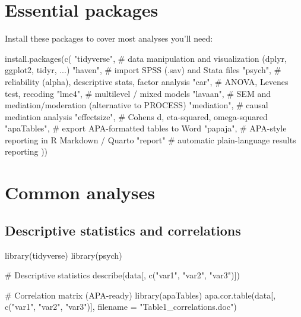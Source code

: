\documentclass[
  11pt,
  a4paper,
]{scrbook}
\newenvironment{Shaded}{\begin{snugshade}}{\end{snugshade}}
\newcommand{\AttributeTok}[1]{\textcolor[rgb]{0.40,0.45,0.13}{#1}}
\newcommand{\CommentTok}[1]{\textcolor[rgb]{0.37,0.37,0.37}{#1}}
\newcommand{\FunctionTok}[1]{\textcolor[rgb]{0.28,0.35,0.67}{#1}}
\newcommand{\NormalTok}[1]{\textcolor[rgb]{0.00,0.23,0.31}{#1}}
\newcommand{\StringTok}[1]{\textcolor[rgb]{0.13,0.47,0.30}{#1}}
\begin{document}
\section{Essential packages}\label{essential-packages}

Install these packages to cover most analyses you'll need:

\begin{Shaded}
\begin{Highlighting}[]
\FunctionTok{install.packages}\NormalTok{(}\FunctionTok{c}\NormalTok{(}
  \StringTok{"tidyverse"}\NormalTok{,   }\CommentTok{\# data manipulation and visualization (dplyr, ggplot2, tidyr, ...)}
  \StringTok{"haven"}\NormalTok{,       }\CommentTok{\# import SPSS (.sav) and Stata files}
  \StringTok{"psych"}\NormalTok{,       }\CommentTok{\# reliability (alpha), descriptive stats, factor analysis}
  \StringTok{"car"}\NormalTok{,         }\CommentTok{\# ANOVA, Levene\textquotesingle{}s test, recoding}
  \StringTok{"lme4"}\NormalTok{,        }\CommentTok{\# multilevel / mixed models}
  \StringTok{"lavaan"}\NormalTok{,      }\CommentTok{\# SEM and mediation/moderation (alternative to PROCESS)}
  \StringTok{"mediation"}\NormalTok{,   }\CommentTok{\# causal mediation analysis}
  \StringTok{"effectsize"}\NormalTok{,  }\CommentTok{\# Cohen\textquotesingle{}s d, eta{-}squared, omega{-}squared}
  \StringTok{"apaTables"}\NormalTok{,   }\CommentTok{\# export APA{-}formatted tables to Word}
  \StringTok{"papaja"}\NormalTok{,      }\CommentTok{\# APA{-}style reporting in R Markdown / Quarto}
  \StringTok{"report"}       \CommentTok{\# automatic plain{-}language results reporting}
\NormalTok{))}
\end{Highlighting}
\end{Shaded}

\section{Common analyses}\label{common-analyses}

\subsection{Descriptive statistics and
correlations}\label{descriptive-statistics-and-correlations}

\begin{Shaded}
\begin{Highlighting}[]
\FunctionTok{library}\NormalTok{(tidyverse)}
\FunctionTok{library}\NormalTok{(psych)}

\CommentTok{\# Descriptive statistics}
\FunctionTok{describe}\NormalTok{(data[, }\FunctionTok{c}\NormalTok{(}\StringTok{"var1"}\NormalTok{, }\StringTok{"var2"}\NormalTok{, }\StringTok{"var3"}\NormalTok{)])}

\CommentTok{\# Correlation matrix (APA{-}ready)}
\FunctionTok{library}\NormalTok{(apaTables)}
\FunctionTok{apa.cor.table}\NormalTok{(data[, }\FunctionTok{c}\NormalTok{(}\StringTok{"var1"}\NormalTok{, }\StringTok{"var2"}\NormalTok{, }\StringTok{"var3"}\NormalTok{)],}
              \AttributeTok{filename =} \StringTok{"Table1\_correlations.doc"}\NormalTok{)}
\end{Highlighting}
\end{Shaded}
\end{document}
